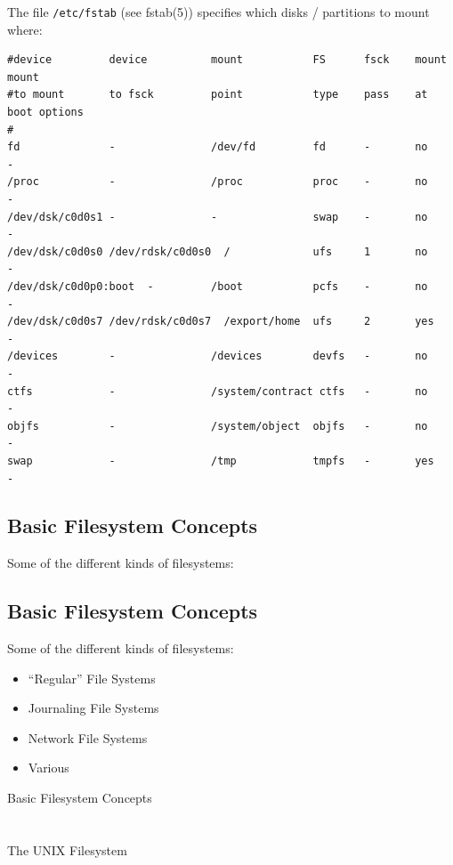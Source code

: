 \documentclass[xga]{xdvislides}
\begin{document}
The file \verb+/etc/fstab+ (see fstab(5)) specifies which disks / partitions
to mount where:
\\
\small
\begin{verbatim}
#device         device          mount           FS      fsck    mount   mount
#to mount       to fsck         point           type    pass    at boot options
#
fd              -               /dev/fd         fd      -       no      -
/proc           -               /proc           proc    -       no      -
/dev/dsk/c0d0s1 -               -               swap    -       no      -
/dev/dsk/c0d0s0 /dev/rdsk/c0d0s0  /             ufs     1       no      -
/dev/dsk/c0d0p0:boot  -         /boot           pcfs    -       no      -
/dev/dsk/c0d0s7 /dev/rdsk/c0d0s7  /export/home  ufs     2       yes
-
/devices        -               /devices        devfs   -       no      -
ctfs            -               /system/contract ctfs   -       no      -
objfs           -               /system/object  objfs   -       no      -
swap            -               /tmp            tmpfs   -       yes     -
\end{verbatim}
\Normalsize

\subsection{Basic Filesystem Concepts}
Some of the different kinds of filesystems:

\subsection{Basic Filesystem Concepts}
Some of the different kinds of filesystems:
\begin{itemize}
	\item ``Regular'' File Systems
	\item Journaling File Systems
	\item Network File Systems
	\item Various
\end{itemize}

\newpage
\vspace*{\fill}
\begin{center}
	\Hugesize
		Basic Filesystem Concepts\\ [1em]
	\hspace*{5mm}
	\blueline\\
	\hspace*{5mm}\\
		The UNIX Filesystem
\end{center}
\vspace*{\fill}
\end{document}
